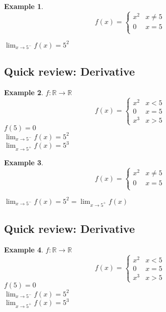 \documentclass[twocolumn,20pt,fleqn]{extarticle}
\theoremstyle{plain}
\theoremstyle{definition}
\newtheorem*{example}{Example}
\theoremstyle{remark}
\begin{document}
\begin{example}
  \[f(x) =
      \begin{cases}
        x^2 & x  \neq  5\\
        0 & x = 5\\
        
      \end{cases}
      \]
      
      


$\displaystyle\lim_{x \to 5^-} f(x) = 5^2 $\end{example}


\clearpage



\subsection{Quick review: Derivative}
\begin{example}
  $f : \mathbb{R}\to \mathbb{R}$
  \[f(x) =
      \begin{cases}
        x^2 & x < 5\\
        0 & x = 5\\
        x^3 & x > 5
      \end{cases}
      \]
      $f(5)=0$\\
$\displaystyle\lim_{x \to 5^-} f(x)  = 5^2$\\
$\displaystyle\lim_{x \to 5^+} f(x)  = 5^3$
\end{example}


\begin{example}
  \[f(x) =
      \begin{cases}
        x^2 & x  \neq  5\\
        0 & x = 5\\
        
      \end{cases}
      \]
      
      


$\displaystyle\lim_{x \to 5^-} f(x) = 5^2  = \displaystyle\lim_{x \to 5^+} f(x)$\\
\end{example}


\clearpage



\subsection{Quick review: Derivative}
\begin{example}
  $f : \mathbb{R}\to \mathbb{R}$
  \[f(x) =
      \begin{cases}
        x^2 & x < 5\\
        0 & x = 5\\
        x^3 & x > 5
      \end{cases}
      \]
      $f(5)=0$\\
$\displaystyle\lim_{x \to 5^-} f(x)  = 5^2$\\
$\displaystyle\lim_{x \to 5^+} f(x)  = 5^3$
\end{example}
\end{document}
